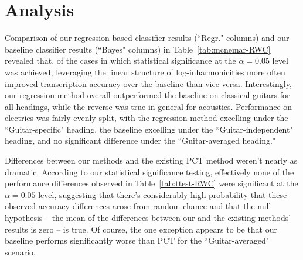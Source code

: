 \documentclass[12pt]{cmuthesis}
\begin{document}
\section{Analysis}
Comparison of our regression-based classifier results (``Regr." columns) and our baseline classifier results (``Bayes" columns) in Table~\ref{tab:mcnemar-RWC} revealed that, of the cases in which statistical significance at the $\alpha = 0.05$ level was achieved, leveraging the linear structure of log-inharmonicities more often improved transcription accuracy over the baseline than vice versa. Interestingly, our regression method overall outperformed the baseline on classical guitars for all headings, while the reverse was true in general for acoustics. Performance on electrics was fairly evenly split, with the regression method excelling under the ``Guitar-specific" heading, the baseline excelling under the ``Guitar-independent" heading, and no significant difference under the ``Guitar-averaged heading."

Differences between our methods and the existing PCT method weren't nearly as dramatic. According to our statistical significance testing, effectively none of the performance differences observed in Table~\ref{tab:ttest-RWC} were significant at the $\alpha = 0.05$ level, suggesting that there's considerably high probability that these observed accuracy differences arose from random chance and that the null hypothesis -- the mean of the differences between our and the existing methods' results is zero -- is true. Of course, the one exception appears to be that our baseline performs significantly worse than PCT for the ``Guitar-averaged" scenario. 
\end{document}
